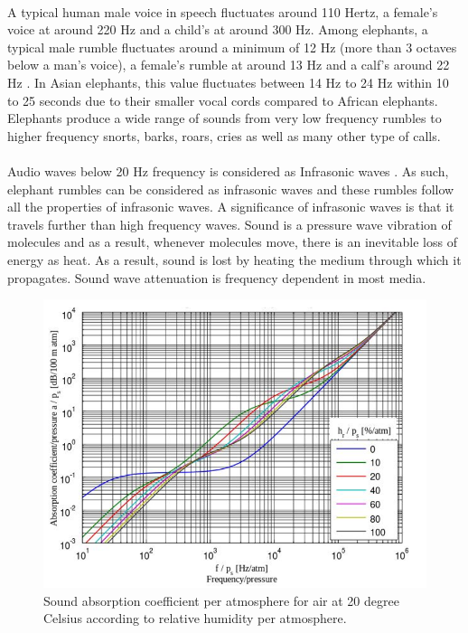 \documentclass[11pt]{article}
\numberwithin{figure}{section}
\numberwithin{table}{section}
\begin{document}
\paragraph{}
A typical human male voice in speech fluctuates around 110 Hertz, a female's voice at around 220 Hz and a child's at around 300 Hz. Among elephants, a typical male rumble fluctuates around a minimum of 12 Hz (more than 3 octaves below a man's voice), a female's rumble at around 13 Hz and a calf's around 22 Hz \cite {1} \cite {2}. In Asian elephants, this value fluctuates between 14 Hz to 24 Hz within 10 to 25 seconds \cite {3} due to their smaller vocal cords compared to African elephants.  Elephants produce a wide range  of sounds from very low frequency rumbles to higher frequency snorts, barks, roars, cries as well as many other type of  calls. 

\paragraph{}
Audio waves below 20 Hz frequency is considered as Infrasonic waves \cite {4}. As such, elephant rumbles can be considered as infrasonic waves and these rumbles follow all the properties of infrasonic waves. A significance of infrasonic waves is that it travels further than high frequency waves. Sound is a pressure wave vibration of molecules and as a result, whenever molecules move, there is an inevitable loss of energy as heat. As a result, sound is lost by heating the medium through which it propagates. Sound wave attenuation is frequency dependent in most media.

\begin{figure}[h]
\centering
\includegraphics[width= 15cm]{a.png}
\caption{Sound absorption coefficient per atmosphere for air at 20 degree Celsius according to relative humidity per atmosphere.\cite{14}}
\label{fig:logo}
\end{figure}
\end{document}
